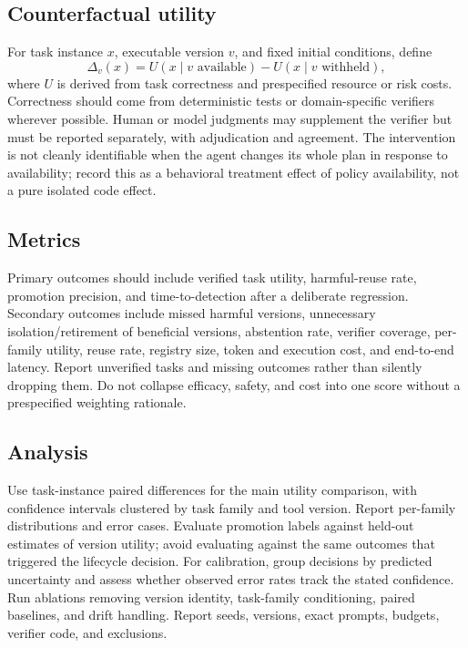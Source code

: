 \documentclass[11pt]{article}
\begin{document}
\subsection{Counterfactual utility}
For task instance $x$, executable version $v$, and fixed initial conditions, define
\[
  \Delta_v(x) = U(x\mid v\text{ available}) - U(x\mid v\text{ withheld}),
\]
where $U$ is derived from task correctness and prespecified resource or risk costs. Correctness should come from deterministic tests or domain-specific verifiers wherever possible. Human or model judgments may supplement the verifier but must be reported separately, with adjudication and agreement. The intervention is not cleanly identifiable when the agent changes its whole plan in response to availability; record this as a behavioral treatment effect of policy availability, not a pure isolated code effect.

\subsection{Metrics}
Primary outcomes should include verified task utility, harmful-reuse rate, promotion precision, and time-to-detection after a deliberate regression. Secondary outcomes include missed harmful versions, unnecessary isolation/retirement of beneficial versions, abstention rate, verifier coverage, per-family utility, reuse rate, registry size, token and execution cost, and end-to-end latency. Report unverified tasks and missing outcomes rather than silently dropping them. Do not collapse efficacy, safety, and cost into one score without a prespecified weighting rationale.

\subsection{Analysis}
Use task-instance paired differences for the main utility comparison, with confidence intervals clustered by task family and tool version. Report per-family distributions and error cases. Evaluate promotion labels against held-out estimates of version utility; avoid evaluating against the same outcomes that triggered the lifecycle decision. For calibration, group decisions by predicted uncertainty and assess whether observed error rates track the stated confidence. Run ablations removing version identity, task-family conditioning, paired baselines, and drift handling. Report seeds, versions, exact prompts, budgets, verifier code, and exclusions.
\end{document}

